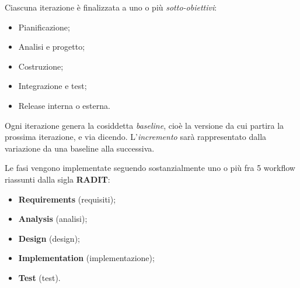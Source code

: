 \documentclass[a4paper,11pt]{article}
\begin{document}
Ciascuna iterazione è finalizzata a uno o più \textit{sotto-obiettivi}: 
\begin{itemize}
	\item Pianificazione;
	\item Analisi e progetto;
	\item Costruzione;
	\item Integrazione e test;
	\item Release interna o esterna.
\end{itemize}

Ogni iterazione genera la cosiddetta \textit{baseline}, cioè la versione da cui partira la prossima iterazione, e via dicendo.
L'\textit{incremento} sarà rappresentato dalla variazione da una baseline alla successiva.

Le fasi vengono implementate seguendo sostanzialmente uno o più fra 5 workflow riassunti dalla sigla \textbf{RADIT}:
\begin{itemize}
	\item \textbf{Requirements} (requisiti);
	\item \textbf{Analysis} (analisi);
	\item \textbf{Design} (design);
	\item \textbf{Implementation} (implementazione);
	\item \textbf{Test} (test).
\end{itemize}
\end{document}
